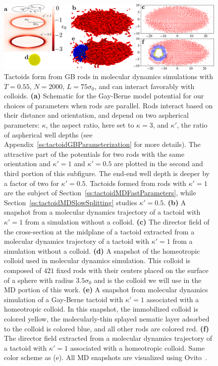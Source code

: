 \documentclass[%
 aip,
 amsmath,amssymb,
 reprint,%
]{revtex4-1}
\begin{document}
\begin{figure}
\centering
\includegraphics[scale=0.4]{media/190718-fig1-nice-v0.pdf}
\caption{Tactoids form from GB rods in molecular dynamics simulations with $T=0.55$, $N=2000$, $L=75\sigma_0$, and can interact favorably with colloids. \textbf{(a)} Schematic for the Gay-Berne model potential for our choices of parameters when rods are parallel. Rods interact based on their distance and orientation, and depend on two aspherical parameters: $\kappa$, the aspect ratio, here set to $\kappa=3$, and $\kappa'$, the ratio of aspherical well depths (see Appendix~\ref{ss:tactoidGBParameterization} for more details). The attractive part of the potentials for two rods with the same orientation and $\kappa'=1$ and $\kappa'=0.5$ are plotted in the second and third portion of this subfigure. The end-end well depth is deeper by a factor of two for $\kappa'=0.5$. Tactoids formed from rods with $\kappa'=1$ are the subject of Section~\ref{ss:tactoidMDFastParameters}, while Section~\ref{ss:tactoidMDSlowSplitting} studies $\kappa'=0.5$. \textbf{(b)} A snapshot from a molecular dynamics trajectory of a tactoid with $\kappa'=1$ from a simulation without a colloid. \textbf{(c)} The director field of the cross-section at the midplane of a tactoid extracted from a molecular dynamics trajectory of a tactoid with $\kappa'=1$ from a simulation without a colloid. \textbf{(d)} A snapshot of the homeotropic colloid used in molecular dynamics simulation. This colloid is composed of $421$ fixed rods with their centers placed on the surface of a sphere with radius $3.5\sigma_0$ and is the colloid we will use in the MD portion of this work. \textbf{(e)} A snapshot from molecular dynamics simulation of a Gay-Berne tactoid with $\kappa'=1$ associated with a homeotropic colloid. In this snapshot, the immobilized colloid is colored yellow, the molecularly-thin splayed nematic layer adsorbed to the colloid is colored blue, and all other rods are colored red. \textbf{(f)} The director field extracted from a molecular dynamics trajectory of a tactoid with $\kappa'=1$ associated with a homeotropic colloid. Same color scheme as (e). All MD snapshots are visualized using Ovito~\cite{Ovito}.}
\label{fig:tactoidSchematicSnapshotDirector}
\end{figure}
\end{document}

